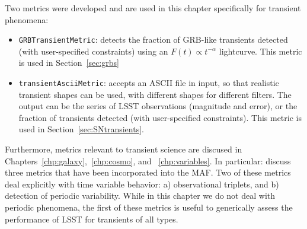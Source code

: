 
%

%


Two metrics were developed and are used in this chapter specifically for transient phenomena:
\begin{itemize}
  \item{\texttt{GRBTransientMetric}: detects the fraction of GRB-like transients detected (with user-specified constraints) using an $F(t) \propto t^{-\alpha}$
    lightcurve. This metric is used in Section~\ref{sec:grbs}}
  \item{\texttt{transientAsciiMetric}: accepts an ASCII file in input, so that realistic transient shapes can be used, with different shapes for different filters. The output can be the series of LSST observations (magnitude and error), or the fraction of transients detected (with user-specified constraints). This metric is used in Section~\ref{sec:SNtransients}.}
\end{itemize}
    
Furthermore, metrics relevant to transient science are discused in Chapters~\ref{chp:galaxy},~\ref{chp:cosmo}, and ~\ref{chp:variables}. In particular: 
\citet{2015arXiv150803175L} discuss
three metrics that have been incorporated into the MAF. Two of these
metrics deal explicitly with time variable behavior: a) observational
triplets, and b) detection of periodic variability. While in this
chapter we do not deal with periodic phenomena, the first of these
metrics is useful to generically assess the performance of LSST for
transients of all types.

